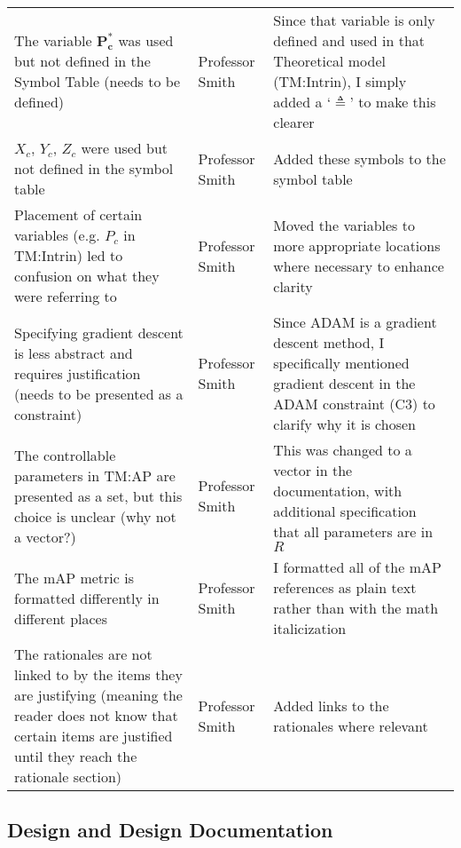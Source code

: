 \documentclass{article}
\begin{document}
\begin{longtable}{p{5cm}p{4cm}p{5cm}}
    The variable $\mathbf{P_{c}^{*}}$ was used but not defined in the Symbol Table (needs to be defined) & Professor Smith & Since that variable is only defined and used in that Theoretical model (TM:Intrin), I simply added a `$\triangleq{}$' to make this clearer \\ 
    \addlinespace[0.5cm]

    $X_c$, $Y_c$, $Z_c$ were used but not defined in the symbol table & Professor Smith & Added these symbols to the symbol table \\ 
    \addlinespace[0.5cm]

    Placement of certain variables (e.g. $P_{c}$ in TM:Intrin) led to confusion on what they were referring to & Professor Smith & Moved the variables to more appropriate locations where necessary to enhance clarity \\ 
    \addlinespace[0.5cm]

    Specifying gradient descent is less abstract and requires justification (needs to be presented as a constraint) & Professor Smith & Since ADAM is a gradient descent method, I specifically mentioned gradient descent in the ADAM constraint (C3) to clarify why it is chosen \\ 
    \addlinespace[0.5cm]

    The controllable parameters in TM:AP are presented as a set, but this choice is unclear (why not a vector?) & Professor Smith & This was changed to a vector in the documentation, with additional specification that all parameters are in $R$ \\ 
    \addlinespace[0.5cm]

    The mAP metric is formatted differently in different places & Professor Smith & I formatted all of the mAP references as plain text rather than with the math italicization \\ 
    \addlinespace[0.5cm]

    The rationales are not linked to by the items they are justifying (meaning the reader does not know that certain items are justified until they reach the rationale section) & Professor Smith & Added links to the rationales where relevant \\ 
    
    \bottomrule
\end{longtable}

\newpage

\subsection{Design and Design Documentation}
\end{document}
